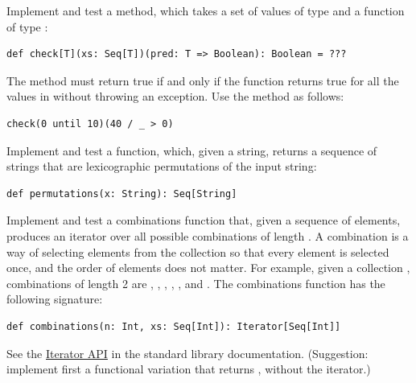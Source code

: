 \documentclass[11pt]{article}
\begin{document}
\begin{myExercise}
Implement and test a  method, which takes a set of values of type  and a function of type :
\begin{lstlisting}
def check[T](xs: Seq[T])(pred: T => Boolean): Boolean = ???
\end{lstlisting}
The method must return true if and only if the  function returns true for all the values in  without throwing an exception. Use the  method as follows:
\begin{lstlisting}
check(0 until 10)(40 / _ > 0)
\end{lstlisting}
\end{myExercise}


\begin{myExercise}
Implement and test a  function, which, given a string, returns a sequence of strings that are lexicographic permutations of the input string:
\begin{lstlisting}
def permutations(x: String): Seq[String]
\end{lstlisting}
\end{myExercise}

\begin{myExercise}
Implement and test a combinations function that, given a sequence of elements, produces an iterator over all possible combinations of length . A combination is a way of selecting elements from the collection so that every element is selected once, and the order of elements does not matter. For example, given a collection , combinations of length 2 are , , , , , and . The combinations function has the following signature:
\begin{lstlisting}
def combinations(n: Int, xs: Seq[Int]): Iterator[Seq[Int]]
\end{lstlisting}
See the \href{https://docs.scala-lang.org/overviews/collections-2.13/iterators.html}{Iterator API} in the standard library documentation.
(Suggestion: implement first a functional variation that returns , without the iterator.)
\end{myExercise}
\end{document}
